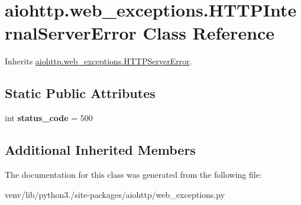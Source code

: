 \hypertarget{classaiohttp_1_1web__exceptions_1_1_h_t_t_p_internal_server_error}{}\section{aiohttp.\+web\+\_\+exceptions.\+H\+T\+T\+P\+Internal\+Server\+Error Class Reference}
\label{classaiohttp_1_1web__exceptions_1_1_h_t_t_p_internal_server_error}


Inherits \hyperlink{classaiohttp_1_1web__exceptions_1_1_h_t_t_p_server_error}{aiohttp.\+web\+\_\+exceptions.\+H\+T\+T\+P\+Server\+Error}.

\subsection*{Static Public Attributes}
\begin{DoxyCompactItemize}
\item 
\mbox{\label{classaiohttp_1_1web__exceptions_1_1_h_t_t_p_internal_server_error_ac1c75395a1e1652392315d7dac134227}} 
int {\bfseries status\+\_\+code} = 500
\end{DoxyCompactItemize}
\subsection*{Additional Inherited Members}


The documentation for this class was generated from the following file\+:\begin{DoxyCompactItemize}
\item 
venv/lib/python3./site-\/packages/aiohttp/web\+\_\+exceptions.\+py\end{DoxyCompactItemize}

